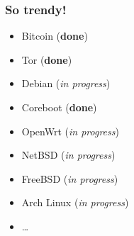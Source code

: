 \documentclass[14pt]{beamer}
\begin{document}
\begin{frame}[plain]
\end{frame}

\begin{frame}
 \frametitle{So trendy!}

 \begin{itemize}
 \item Bitcoin (\textbf{done})
 \item Tor (\textbf{done})
 \item Debian (\emph{in progress})
 \item Coreboot (\textbf{done})
 \item OpenWrt (\emph{in progress})
 \item NetBSD (\emph{in progress})
 \item FreeBSD (\emph{in progress})
 \item Arch Linux (\emph{in progress})
 \item \ldots{}
\end{itemize}

\end{frame}
\end{document}
